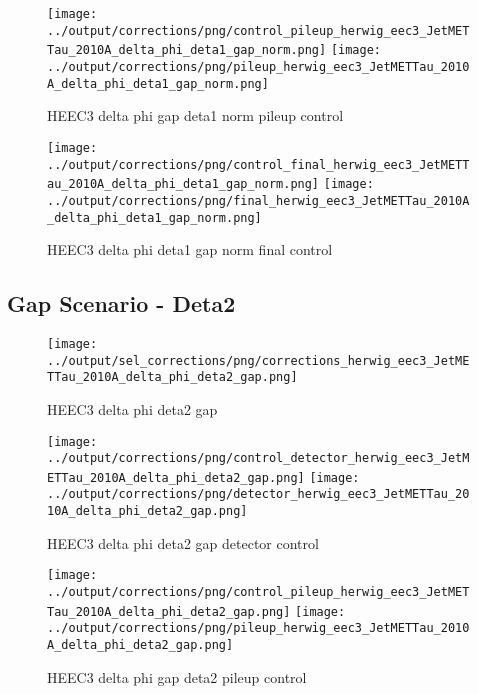 \documentclass[11pt]{book}
\begin{document}
\begin{figure}[ht]
\centering
\texttt{[image: ../output/corrections/png/control\_pileup\_herwig\_eec3\_JetMETTau\_2010A\_delta\_phi\_deta1\_gap\_norm.png]}
\texttt{[image: ../output/corrections/png/pileup\_herwig\_eec3\_JetMETTau\_2010A\_delta\_phi\_deta1\_gap\_norm.png]}
\caption{HEEC3 delta phi gap deta1 norm pileup control}
\label{fig:HEEC3_JetMETTau_2010A_delta_phi_deta1_gap_norm_pileup_control}
\end{figure}


\begin{figure}[ht]
\centering
\texttt{[image: ../output/corrections/png/control\_final\_herwig\_eec3\_JetMETTau\_2010A\_delta\_phi\_deta1\_gap\_norm.png]}
\texttt{[image: ../output/corrections/png/final\_herwig\_eec3\_JetMETTau\_2010A\_delta\_phi\_deta1\_gap\_norm.png]}
\caption{HEEC3 delta phi deta1 gap norm final control}
\label{fig:HEEC3_JetMETTau_2010A_delta_phi_deta1_gap_norm_final_control}
\end{figure}


\clearpage
\subsection{Gap Scenario - Deta2}
\begin{figure}[ht]
\centering
\texttt{[image: ../output/sel\_corrections/png/corrections\_herwig\_eec3\_JetMETTau\_2010A\_delta\_phi\_deta2\_gap.png]}
\caption{HEEC3 delta phi deta2 gap}
\label{fig:HEEC3_JetMETTau_2010A_delta_phi_deta2_gap}
\end{figure}

\begin{figure}[ht]
\centering
\texttt{[image: ../output/corrections/png/control\_detector\_herwig\_eec3\_JetMETTau\_2010A\_delta\_phi\_deta2\_gap.png]}
\texttt{[image: ../output/corrections/png/detector\_herwig\_eec3\_JetMETTau\_2010A\_delta\_phi\_deta2\_gap.png]}
\caption{HEEC3 delta phi deta2 gap detector control}
\label{fig:HEEC3_JetMETTau_2010A_delta_phi_deta2_gap_detector_control}
\end{figure}

\begin{figure}[ht]
\centering
\texttt{[image: ../output/corrections/png/control\_pileup\_herwig\_eec3\_JetMETTau\_2010A\_delta\_phi\_deta2\_gap.png]}
\texttt{[image: ../output/corrections/png/pileup\_herwig\_eec3\_JetMETTau\_2010A\_delta\_phi\_deta2\_gap.png]}
\caption{HEEC3 delta phi gap deta2 pileup control}
\label{fig:HEEC3_JetMETTau_2010A_delta_phi_deta2_gap_pileup_control}
\end{figure}
\end{document}
